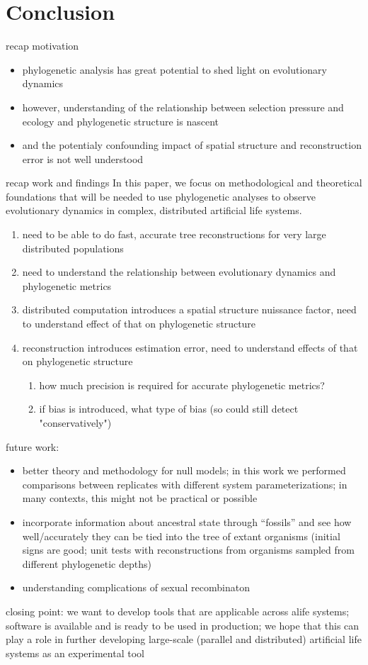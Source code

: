 \section{Conclusion} \label{sec:conclusion}

recap motivation
\begin{itemize}
    \item phylogenetic analysis has great potential to shed light on evolutionary dynamics
    \item however, understanding of the relationship between selection pressure and ecology and phylogenetic structure is nascent
    \item   and the potentialy confounding impact of spatial structure and reconstruction error is not well understood
\end{itemize}

recap work and findings
In this paper, we focus on methodological and theoretical foundations that will be needed to use phylogenetic analyses to observe evolutionary dynamics in complex, distributed artificial life systems.
\begin{enumerate}
    \item need to be able to do fast, accurate tree reconstructions for very large distributed populations
    \item need to understand the relationship between evolutionary dynamics and phylogenetic metrics 
    \item distributed computation introduces a spatial structure nuissance factor, need to understand effect of that on phylogenetic structure
    \item reconstruction introduces estimation error, need to understand effects of that on phylogenetic structure
    \begin{enumerate}
        \item how much precision is required for accurate phylogenetic metrics?
        \item if bias is introduced, what type of bias (so could still detect "conservatively")
    \end{enumerate}
    \end{enumerate}

future work:
\begin{itemize}
    \item better theory and methodology for null models; in this work we performed comparisons between replicates with different system parameterizations; in many contexts, this might not be practical or possible
    \item  incorporate information about ancestral state through ``fossils'' and see how well/accurately they can be tied into the tree of extant organisms (initial signs are good; unit tests with reconstructions from organisms sampled from different phylogenetic depths)
    \item  understanding complications of sexual recombinaton
\end{itemize}

closing point: we want to develop tools that are applicable across alife systems; software is available and is ready to be used in production; we hope that this can play a role in further developing large-scale (parallel and distributed) artificial life systems as an experimental tool
